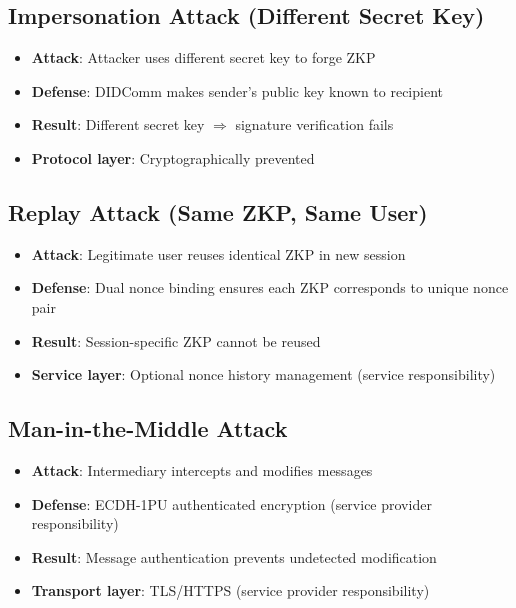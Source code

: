 \subsection{Impersonation Attack (Different Secret Key)}

\begin{itemize}
  \item \textbf{Attack}: Attacker uses different secret key to forge ZKP
  \item \textbf{Defense}: DIDComm makes sender's public key known to recipient
  \item \textbf{Result}: Different secret key $\Rightarrow$ signature verification fails
  \item \textbf{Protocol layer}: Cryptographically prevented
\end{itemize}

\subsection{Replay Attack (Same ZKP, Same User)}

\begin{itemize}
  \item \textbf{Attack}: Legitimate user reuses identical ZKP in new session
  \item \textbf{Defense}: Dual nonce binding ensures each ZKP corresponds to unique nonce pair
  \item \textbf{Result}: Session-specific ZKP cannot be reused
  \item \textbf{Service layer}: Optional nonce history management (service responsibility)
\end{itemize}

\subsection{Man-in-the-Middle Attack}

\begin{itemize}
  \item \textbf{Attack}: Intermediary intercepts and modifies messages
  \item \textbf{Defense}: ECDH-1PU authenticated encryption (service provider responsibility)
  \item \textbf{Result}: Message authentication prevents undetected modification
  \item \textbf{Transport layer}: TLS/HTTPS (service provider responsibility)
\end{itemize}

